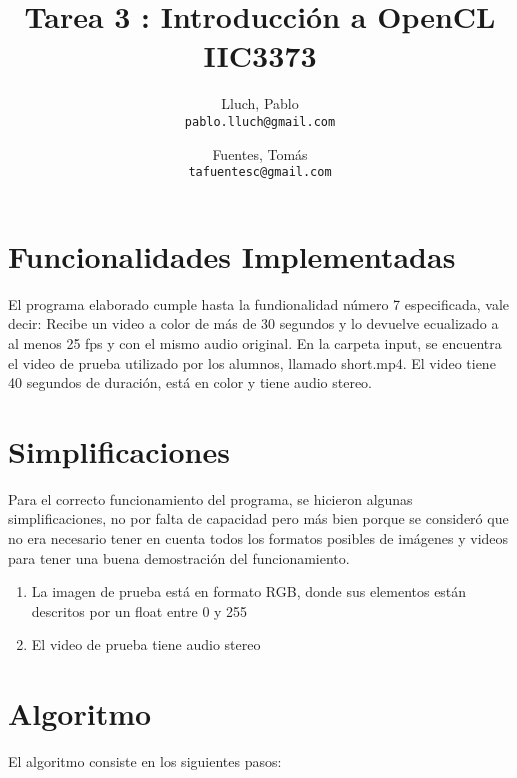\documentclass[12pt,spanish]{article}
\author{
  Lluch, Pablo\\
  \texttt{pablo.lluch@gmail.com}
  \and
  Fuentes, Tomás\\
  \texttt{tafuentesc@gmail.com}
}
\title{Tarea 3 : Introducción a OpenCL \\ IIC3373}
\begin{document}
	\maketitle
	\newpage
	\section{Funcionalidades Implementadas}

	El programa elaborado cumple hasta la fundionalidad número 7 especificada, vale decir: Recibe un video a color de más de 30 segundos y lo devuelve ecualizado a al menos 25 fps y con el mismo audio original. En la carpeta input, se encuentra el video de prueba utilizado por los alumnos, llamado short.mp4. El video tiene 40 segundos de duración, está en color y tiene audio stereo. 

	\section{Simplificaciones}

	Para el correcto funcionamiento del programa, se hicieron algunas simplificaciones, no por falta de capacidad pero m\'as bien porque se consider\'o que no era necesario tener en cuenta todos los formatos posibles de im\'agenes y videos para tener una buena demostraci\'on del funcionamiento.
	\begin{enumerate}
	\item La imagen de prueba est\'a en formato RGB, donde sus elementos est\'an descritos por un float entre 0 y 255
	\item El video de prueba tiene audio stereo
	\end{enumerate}

	\section{Algoritmo}
	El algoritmo consiste en los siguientes pasos:
\end{document}
